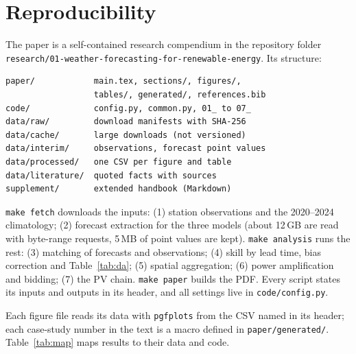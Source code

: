 \section{Reproducibility}
\label{app:repro}

The paper is a self-contained research compendium in the repository folder \nolinkurl{research/01-weather-forecasting-for-renewable-energy}. Its structure:

\begin{lstlisting}
paper/            main.tex, sections/, figures/,
                  tables/, generated/, references.bib
code/             config.py, common.py, 01_ to 07_
data/raw/         download manifests with SHA-256
data/cache/       large downloads (not versioned)
data/interim/     observations, forecast point values
data/processed/   one CSV per figure and table
data/literature/  quoted facts with sources
supplement/       extended handbook (Markdown)
\end{lstlisting}

 \texttt{make fetch} downloads the inputs: (1) station observations and the 2020--2024 climatology; (2) forecast extraction for the three models (about 12\,GB are read with byte-range requests, 5\,MB of point values are kept). \texttt{make analysis} runs the rest: (3) matching of forecasts and observations; (4) skill by lead time, bias correction and Table~\ref{tab:da}; (5) spatial aggregation; (6) power amplification and bidding; (7) the PV chain. \texttt{make paper} builds the PDF. Every script states its inputs and outputs in its header, and all settings live in \texttt{code/config.py}.

 Each figure file reads its data with \texttt{pgfplots} from the CSV named in its header; each case-study number in the text is a macro defined in \texttt{paper/generated/}. Table~\ref{tab:map} maps results to their data and code.

